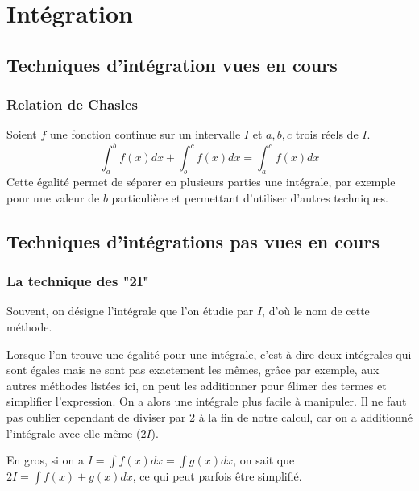 \documentclass[10pt,a4paper]{book}
\begin{document}
\chapter{Intégration}
\section{Techniques d'intégration vues en cours}
\subsection{Relation de Chasles}
Soient $f$ une fonction continue sur un intervalle $I$ et $a,b,c$ trois réels de $I$.
\[\int^b_af(x)dx + \int^c_bf(x)dx = \int^c_af(x)dx\]
Cette égalité permet de séparer en plusieurs parties une intégrale, par exemple pour une valeur de $b$ particulière et permettant d'utiliser d'autres techniques.

\section{Techniques d'intégrations pas vues en cours}
\subsection{La technique des "2I"}
Souvent, on désigne l'intégrale que l'on étudie par $I$, d'où le nom de cette méthode.\par 
Lorsque l'on trouve une égalité pour une intégrale, c'est-à-dire deux inté\-grales qui sont égales mais ne sont pas exactement les mêmes, grâce par exemple, aux autres méthodes listées ici, on peut les additionner pour élimer des termes et simplifier l'expression. On a alors une intégrale plus facile à manipuler. Il ne faut pas oublier cependant de diviser par 2 à la fin de notre calcul, car on a additionné l'intégrale avec elle-même ($2I$).\par 
En gros, si on a $I=\int f(x)dx = \int g(x)dx$, on sait que $2I = \int f(x)+g(x)dx$, ce qui peut parfois être simplifié.
\end{document}
